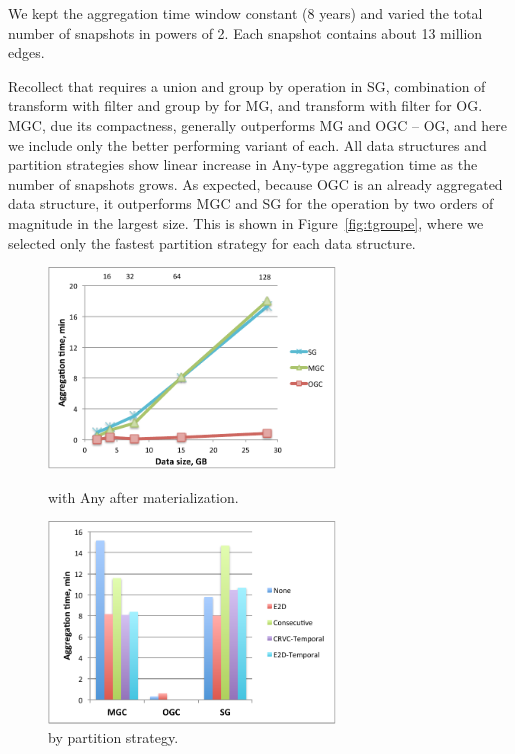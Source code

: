 We kept the aggregation time window constant (8 years) and varied the
total number of snapshots in powers of 2.  Each snapshot contains
about 13 million edges.

Recollect that  requires a union and group by operation
in SG, combination of transform with filter and group by for MG, and
transform with filter for OG.  MGC, due its compactness, generally
outperforms MG and OGC -- OG, and here we include only the better
performing variant of each.  All data structures and partition
strategies show linear increase in Any-type aggregation time as the
number of snapshots grows.  As expected, because OGC is an already
aggregated data structure, it outperforms MGC and SG for the
 operation by two orders of magnitude in the largest
size.  This is shown in Figure~\ref{fig:tgroupe}, where we selected
only the fastest partition strategy for each data structure.  

\begin{figure}[t!]
\centering
\begin{minipage}{3.3in}
  \centering
  \includegraphics[width=3in]{figs/tgroupe_warm.pdf}
  \caption{ with Any after materialization.}
  \label{fig:tgroupe}
\end{minipage}
\begin{minipage}{3.3in}
  \centering
  \includegraphics[width=3in]{figs/tgroupeparts.pdf}
  \caption{ by partition strategy.}
  \label{fig:tgroupeparts}
\end{minipage}
\end{figure}

